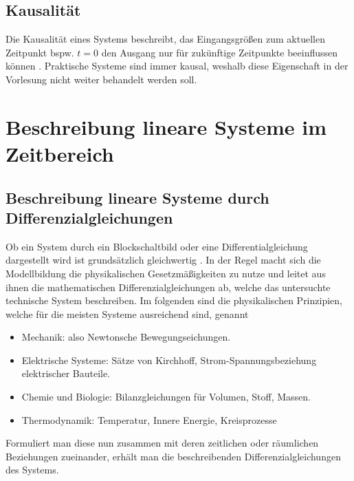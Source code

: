 \subsection{Kausalität}
%
Die Kausalität eines Systems beschreibt, das Eingangsgrößen zum aktuellen Zeitpunkt bspw. $t=0$ den Ausgang nur für zukünftige Zeitpunkte beeinflussen können \cite{Lunze10}. Praktische Systeme sind immer kausal, weshalb diese Eigenschaft in der Vorlesung nicht weiter behandelt werden soll. 
%
\section{Beschreibung lineare Systeme im Zeitbereich}
%
\subsection{Beschreibung lineare Systeme durch Differenzialgleichungen}
%
Ob ein System durch ein Blockschaltbild oder eine Differentialgleichung dargestellt wird ist grundsätzlich gleichwertig \cite{Ament17}. In der Regel macht sich die Modellbildung die physikalischen Gesetzmäßigkeiten zu nutze und leitet aus ihnen die mathematischen Differenzialgleichungen ab, welche das untersuchte technische System beschreiben. Im folgenden sind die physikalischen Prinzipien, welche für die meisten Systeme ausreichend sind, genannt \cite{Ament17}
\begin{itemize}
	\item Mechanik: also Newtonsche Bewegungseichungen.
	\item Elektrische Systeme: Sätze von Kirchhoff, Strom-Spannungsbeziehung elektrischer Bauteile.
	\item Chemie und Biologie: Bilanzgleichungen für Volumen, Stoff, Massen.
	\item Thermodynamik: Temperatur, Innere Energie, Kreisprozesse
\end{itemize}
%
Formuliert man diese nun zusammen mit deren zeitlichen oder räumlichen Beziehungen zueinander, erhält man die beschreibenden Differenzialgleichungen des Systems.
%
